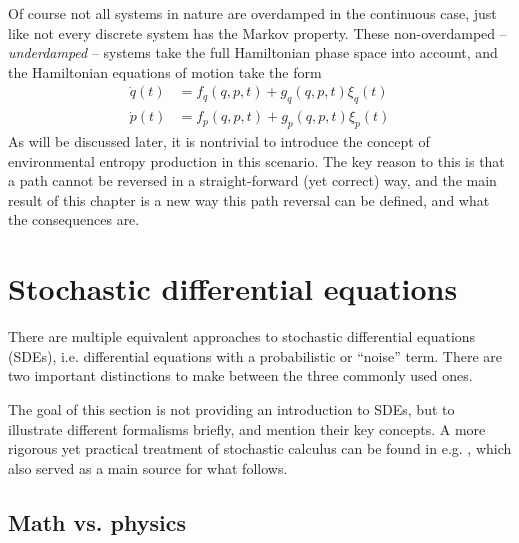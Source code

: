 Of course not all systems in nature are overdamped in the continuous case, just like not every discrete system has the Markov property. These non-overdamped -- \emph{underdamped} -- systems take the full Hamiltonian phase space into account, and the Hamiltonian equations of motion take the form
%
\begin{equation}\begin{split}
	\label{eqn:general hamiltonian equations}
	\dot q(t) &= f_q(q,p,t) + g_q(q,p,t)\xi_q(t) \\
	\dot p(t) &= f_p(q,p,t) + g_p(q,p,t)\xi_p(t)
\end{split}\end{equation}
%
As will be discussed later, it is nontrivial to introduce the concept of environmental entropy production in this scenario. The key reason to this is that a path cannot be reversed in a straight-forward (yet correct) way, and the main result of this chapter is a new way this path reversal can be defined, and what the consequences are.







\section{Stochastic differential equations}

There are multiple equivalent approaches to stochastic differential equations (SDEs), i.e. differential equations with a probabilistic or ``noise'' term. There are two important distinctions to make between the three commonly used ones.

The goal of this section is not providing an introduction to SDEs, but to illustrate different formalisms briefly, and mention their key concepts. A more rigorous yet practical treatment of stochastic calculus can be found in e.g. \cite{sde}, which also served as a main source for what follows.

\subsection{Math vs. physics}
\label{sec:math vs physics}

